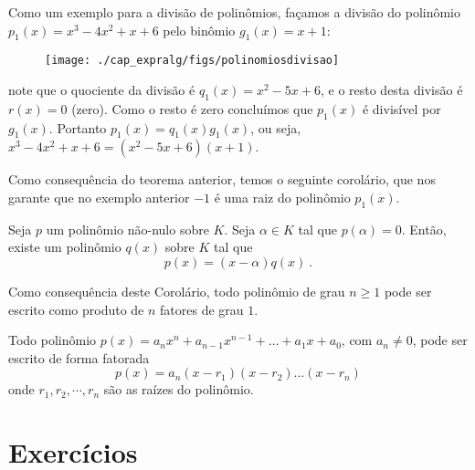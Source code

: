  \begin{exem}
  Como um exemplo para a divisão de polinômios, façamos a divisão do polinômio $p_1(x)=x^3-4x^2+x+6$ pelo binômio $g_1(x)=x+1$:

 \begin{figure}[H]
 \centering
 \texttt{[image: ./cap\_expralg/figs/polinomiosdivisao]}
 \end{figure}

 note que o quociente da divisão é $q_1(x)= x^2 - 5x + 6$, e o resto desta divisão é $r(x)=0$ (zero). Como o resto é zero concluímos que $p_1(x)$ é divisível por $g_1(x)$. Portanto $p_1(x)= q_1(x)g_1(x)$, ou seja, $x^3-4x^2+x+6= (x^2-5x+6)(x+1)$.
 \end{exem}

 Como consequência do teorema anterior, temos o seguinte corolário, que nos garante que no exemplo anterior $-1$ é uma raiz do polinômio $p_1(x)$.

 \begin{cor}
 Seja $p$ um polinômio não-nulo sobre $K$. Seja $\alpha \in K$ tal que $p(\alpha)=0$. Então, existe um polinômio $q(x)$ sobre $K$ tal que
\begin{equation}
p(x)= (x - \alpha)q(x) \ .
\end{equation}
 \end{cor}

 Como consequência deste Corolário, todo polinômio de grau $n \geq 1$ pode ser escrito como produto de $n$ fatores de grau $1$.

 \begin{teo}
  Todo polinômio $p(x)= a_nx^n + a_{n-1}x^{n-1}+ \ldots + a_1x+ a_0$, com $a_n \neq 0$, pode ser escrito de forma fatorada
\begin{equation}
p(x)= a_n(x - r_1)(x - r_2) \ldots (x - r_n)
\end{equation}
  onde $r_1, r_2, \cdots, r_n$ são as raízes do polinômio.
 \end{teo}
 
 \section{Exercícios}

\construirExer

